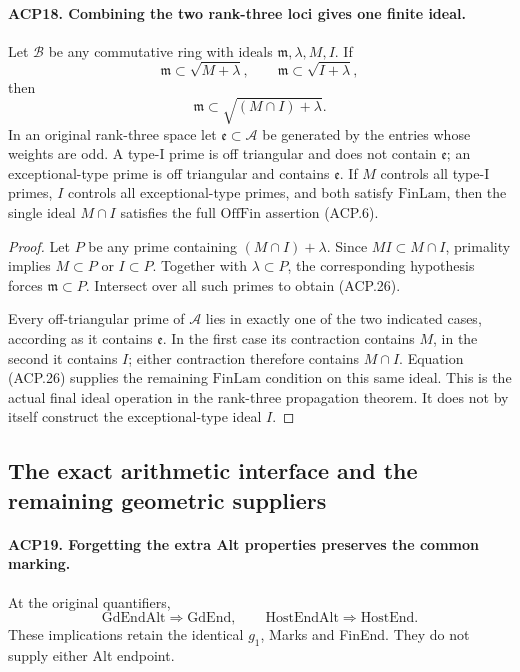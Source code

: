 \paragraph{ACP18. Combining the two rank-three loci gives one finite ideal.}
\label{claim:ACP18}
Let \(\mathcal B\) be any commutative ring with ideals
\(\mathfrak m,\lambda,M,I\).  If
\[
 \mathfrak m\subset\sqrt{M+\lambda},\qquad
 \mathfrak m\subset\sqrt{I+\lambda},
\]
then
\[
                  \mathfrak m\subset\sqrt{(M\cap I)+\lambda}.
                                                        \tag{ACP.26}
\]
In an original rank-three space let
\(\mathfrak e\subset\mathcal A\) be generated by the entries
whose weights are odd.  A type-I prime is off triangular and
does not contain \(\mathfrak e\); an exceptional-type prime
is off triangular and contains \(\mathfrak e\).
If \(M\) controls all type-I primes, \(I\) controls all
exceptional-type primes, and both satisfy \(\mathrm{FinLam}\),
then the single ideal \(M\cap I\) satisfies the full
\(\mathrm{OffFin}\) assertion (ACP.6).

\begin{proof}
Let \(P\) be any prime containing \((M\cap I)+\lambda\).
Since \(MI\subset M\cap I\), primality implies
\(M\subset P\) or \(I\subset P\).  Together with
\(\lambda\subset P\), the corresponding hypothesis forces
\(\mathfrak m\subset P\).  Intersect over all such primes
to obtain (ACP.26).

Every off-triangular prime of \(\mathcal A\) lies in exactly
one of the two indicated cases, according as it contains
\(\mathfrak e\).  In the first case its contraction contains
\(M\), in the second it contains \(I\); either contraction
therefore contains \(M\cap I\).  Equation (ACP.26) supplies
the remaining \(\mathrm{FinLam}\) condition on this same
ideal.  This is the actual final ideal operation in the
rank-three propagation theorem.  It does not by itself
construct the exceptional-type ideal \(I\).
\end{proof}

\subsection{The exact arithmetic interface and the remaining geometric suppliers}

\paragraph{ACP19. Forgetting the extra Alt properties preserves the common marking.}
\label{claim:ACP19}
At the original quantifiers,
\[
 \mathrm{GdEndAlt}\Longrightarrow\mathrm{GdEnd},
 \qquad \mathrm{HostEndAlt}\Longrightarrow\mathrm{HostEnd}.
                                                        \tag{ACP.27}
\]
These implications retain the identical \(g_1\), Marks and
FinEnd.  They do not supply either Alt endpoint.

